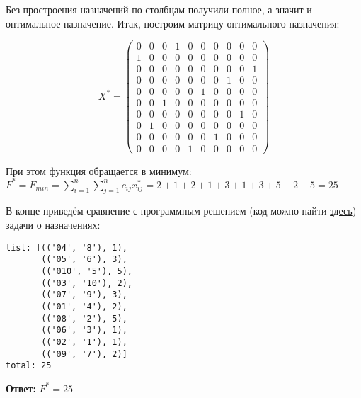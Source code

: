 Без простроения назначений по столбцам получили полное, а значит и оптимальное назначение. Итак, построим матрицу оптимального назначения:

\[
    X^* = \begin{pmatrix}
        0 & 0 & 0 & 1 & 0 & 0 & 0 & 0 & 0 & 0 \\
        1 & 0 & 0 & 0 & 0 & 0 & 0 & 0 & 0 & 0 \\
        0 & 0 & 0 & 0 & 0 & 0 & 0 & 0 & 0 & 1 \\
        0 & 0 & 0 & 0 & 0 & 0 & 0 & 1 & 0 & 0 \\
        0 & 0 & 0 & 0 & 0 & 1 & 0 & 0 & 0 & 0 \\
        0 & 0 & 1 & 0 & 0 & 0 & 0 & 0 & 0 & 0 \\
        0 & 0 & 0 & 0 & 0 & 0 & 0 & 0 & 1 & 0 \\
        0 & 1 & 0 & 0 & 0 & 0 & 0 & 0 & 0 & 0 \\
        0 & 0 & 0 & 0 & 0 & 0 & 1 & 0 & 0 & 0 \\
        0 & 0 & 0 & 0 & 1 & 0 & 0 & 0 & 0 & 0
    \end{pmatrix}
\]

При этом функция обращается в минимум: $F^* = F_{min} = \sum\limits_{i=1}^{n} \sum\limits_{j=1}^{n} c_{ij} x^*_{ij} = 2 + 1 + 2 + 1 + 3 + 1 + 3 + 5 + 2 + 5 = 25$

В конце приведём сравнение с программным решением (код можно найти \href{https://github.com/retrobannerS/optimization_methods/blob/main/python/08-lab/hungarian-algorithm.ipynb}{здесь}) задачи о назначениях:


\begin{lstlisting}[language=text]
list: [(('04', '8'), 1),
       (('05', '6'), 3),
       (('010', '5'), 5),
       (('03', '10'), 2),
       (('07', '9'), 3),
       (('01', '4'), 2),
       (('08', '2'), 5),
       (('06', '3'), 1),
       (('02', '1'), 1),
       (('09', '7'), 2)]
total: 25
\end{lstlisting}

\textbf{Ответ:} $F^* = 25$ \label{08-lab-answer}

\newpage